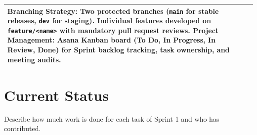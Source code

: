 \documentclass[11pt,letterpaper]{article}
\begin{document}
\begin{tabularx}{\textwidth}{|p{4.8cm}|X|}
\textbf{Branching Strategy:} Two protected branches (\texttt{main} for stable releases, \texttt{dev} for staging). Individual features developed on \texttt{feature/\textless name\textgreater} with mandatory pull request reviews.\newline
\textbf{Project Management:} Asana Kanban board (To Do, In Progress, In Review, Done) for Sprint backlog tracking, task ownership, and meeting audits. \\ \hline
\end{tabularx}

\newpage


\section{Current Status}
Describe how much work is done for each task of Sprint 1 and who has contributed.
\end{document}
